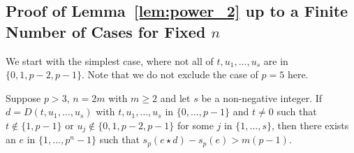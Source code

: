 \documentclass[12pt]{article}
\newcommand{\wt}{s_p}
\begin{document}
\subsection{Proof of Lemma~\ref{lem:power_2} up to a Finite Number of Cases for Fixed \texorpdfstring{$n$}{n}}
We start with the simplest case, where not all of $t,u_1,\dots,u_s$ are in $\{0,1,p-2,p-1\}$. Note that we do not exclude the case of $p=5$ here.


\begin{lemma} \label{lem:power_2_finite}
Suppose $p>3$, $n = 2m$ with $m \geq 2$ and let $s$ be a non-negative integer. If $d = D(t,u_1,\dots,u_s)$ with $t, u_1,\dots,u_s$ in $\{0,\dots,p-1\}$ and $t\neq 0$ such that $t \notin\{1,p-1\}$ or $u_j \notin \{0,1,p-2,p-1\}$ for some $j$ in $\{1,\dots,s\}$, then there exists an  $e$ in $\{1,\dots,p^n-1\}$ such that $\wt(e \star d) - \wt(e) > m(p-1)$.
\end{lemma}
\end{document}
